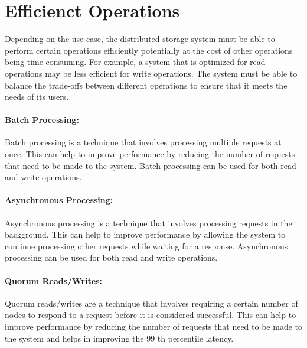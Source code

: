 \section{Efficienct Operations}
Depending on the use case, the distributed storage system must be able to perform certain operations efficiently potentially at the cost of other operations being time consuming. For example, a system that is optimized for read operations may be less efficient for write operations. The system must be able to balance the trade-offs between different operations to ensure that it meets the needs of its users.

\paragraph{Batch Processing:} Batch processing is a technique that involves processing multiple requests at once. This can help to improve performance by reducing the number of requests that need to be made to the system. Batch processing can be used for both read and write operations.

\paragraph{Asynchronous Processing:} Asynchronous processing is a technique that involves processing requests in the background. This can help to improve performance by allowing the system to continue processing other requests while waiting for a response. Asynchronous processing can be used for both read and write operations.

\paragraph{Quorum Reads/Writes:} Quorum reads/writes are a technique that involves requiring a certain number of nodes to respond to a request before it is considered successful. This can help to improve performance by reducing the number of requests that need to be made to the system and helps in improving the 99
th percentile latency.
